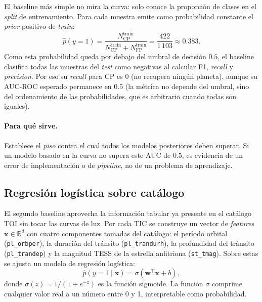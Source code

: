 \documentclass[11pt,a4paper]{article}
\begin{document}
El baseline más simple no mira la curva: solo conoce la proporción
de clases en el \textit{split} de entrenamiento. Para cada muestra
emite como probabilidad constante el \textit{prior} positivo de
\textit{train}:
\begin{equation}
\hat{p}(y=1) = \frac{N_{\text{CP}}^{\text{train}}}{N_{\text{CP}}^{\text{train}} + N_{\text{FP}}^{\text{train}}} = \frac{422}{1\,103} \approx 0.383.
\label{eq:random-prior}
\end{equation}
Como esta probabilidad queda por debajo del umbral de decisión $0.5$,
el baseline clasifica todas las muestras del \textit{test} como
negativas al calcular F1, \textit{recall} y \textit{precision}. Por
eso su \textit{recall} para CP es $0$ (no recupera ningún planeta),
aunque su AUC-ROC esperado permanece en $0.5$ (la métrica no depende
del umbral, sino del ordenamiento de las probabilidades, que es
arbitrario cuando todas son iguales).

\paragraph{Para qué sirve.}
Establece el \textit{piso} contra el cual todos los modelos
posteriores deben superar. Si un modelo basado en la curva no supera
este AUC de $0.5$, es evidencia de un error de implementación o de
\textit{pipeline}, no de un problema de aprendizaje.

\subsection{Regresión logística sobre catálogo}
\label{subsec:logreg}

El segundo baseline aprovecha la información tabular ya presente en el
catálogo TOI sin tocar las curvas de luz. Por cada TIC se construye un
vector de \textit{features} $\mathbf{x} \in \mathbb{R}^{d}$ con cuatro
componentes tomadas del catálogo: el período orbital
(\texttt{pl\_orbper}), la duración del tránsito (\texttt{pl\_trandurh}),
la profundidad del tránsito (\texttt{pl\_trandep}) y la magnitud TESS
de la estrella anfitriona (\texttt{st\_tmag}). Sobre estas se ajusta
un modelo de regresión logística:
\begin{equation}
\hat{p}(y=1 \mid \mathbf{x}) = \sigma(\mathbf{w}^\top \mathbf{x} + b),
\label{eq:logreg-sigmoid}
\end{equation}
donde $\sigma(z) = 1 / (1 + e^{-z})$ es la función sigmoide.
La función $\sigma$ comprime cualquier valor real a un
número entre 0 y 1, interpretable como probabilidad.
\end{document}
